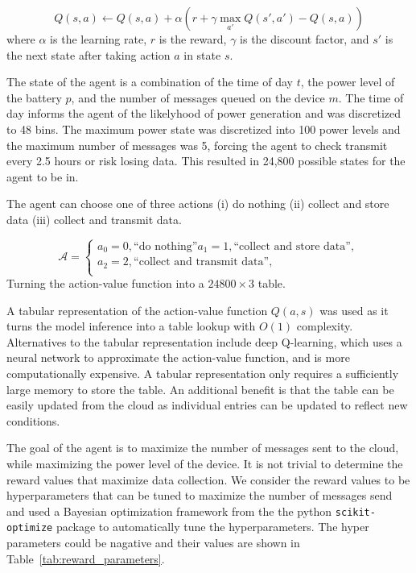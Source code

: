 \documentclass[10pt]{cai}
\begin{document}
\begin{equation}
  Q(s,a) \leftarrow Q(s,a) + \alpha \left( r + \gamma \max_{a'} Q(s',a') - Q(s,a) \right)
\end{equation}
where $\alpha$ is the learning rate, $r$ is the reward, $\gamma$ is the discount factor, and $s'$ is the next state after taking action $a$ in state $s$.

The state of the agent is a combination of the time of day $t$, the power level of the battery $p$, and the number of messages queued on the device $m$.
The time of day informs the agent of the likelyhood of power generation and was discretized to 48 bins.
The maximum power state was discretized into 100 power levels and the maximum number of messages was 5, forcing the agent to check transmit every 2.5 hours or risk losing data.
This resulted in 24,800 possible states for the agent to be in.

The agent can choose one of three actions (i) do nothing (ii) collect and store data (iii) collect and transmit data.

\begin{equation}
  \mathcal{A} = \left\{
  \begin{array}{l}
    a_0 = 0, \text{``do nothing''}
    a_1 = 1, \text{``collect and store data''}, \\
    a_2 = 2, \text{``collect and transmit data''}, \\
  \end{array}
  \right.
  \end{equation}
Turning the action-value function into a $24800 \times 3$ table.
  
A tabular representation of the action-value function $Q(a,s)$ was used as it turns the model inference into a table lookup with $O(1)$ complexity.
Alternatives to the tabular representation include deep Q-learning, which uses a neural network to approximate the action-value function, and is more computationally expensive.
A tabular representation only requires a sufficiently large memory to store the table.
An additional benefit is that the table can be easily updated from the cloud as individual entries can be updated to reflect new conditions.

The goal of the agent is to maximize the number of messages sent to the cloud, while maximizing the power level of the device.
It is not trivial to determine the reward values that maximize data collection.
We consider the reward values to be hyperparameters that can be tuned to maximize the number of messages send and used a Bayesian optimization framework from the the python \verb|scikit-optimize| package to automatically tune the hyperparameters.
The hyper parameters could be nagative and their values are shown in Table~\ref{tab:reward_parameters}.
\end{document}
